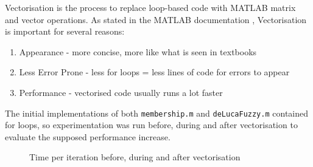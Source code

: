 Vectorisation is the process to replace loop-based code with MATLAB matrix and vector operations. As stated in the MATLAB documentation \cite{vectorisation}, Vectorisation is important for several reasons:

\begin{enumerate}
    \item Appearance - more concise, more like what is seen in textbooks
    \item Less Error Prone - less for loops = less lines of code for errors to appear
    \item Performance - vectorised code usually runs a lot faster
\end{enumerate}

The initial implementations of both \texttt{membership.m} and \texttt{deLucaFuzzy.m} contained for loops, so experimentation was run before, during and after vectorisation to evaluate the supposed performance increase.

\begin{figure}[H]
  \centering
    \caption{Time per iteration before, during and after vectorisation}
    \label{fig:time-per-iteration}
\end{figure}

